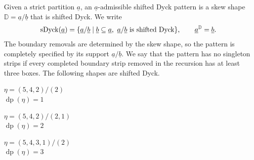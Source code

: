 \documentclass[12pt]{amsart}
\renewcommand{\a}{\underline{a}}
\renewcommand{\b}{\underline{b}}
\newcommand{\DD}{\mathbb{D}}
\newcommand{\defi}[1]{{\upshape\sffamily #1}}
\theoremstyle{definition}
\numberwithin{equation}{section}
\begin{document}
Given a strict partition $\a$, an \defi{$\a$-admissible shifted Dyck
pattern} is a skew shape $\DD=\a/\b$ that is shifted Dyck.
We write
\begin{equation}\label{eq:sh-patterns}
 \operatorname{sDyck}(\a)=
 \{\a/\b\mid\b\subseteq\a,\ \a/\b\textnormal{ is shifted Dyck}\},
 \qquad \a^{\DD}=\b.
\end{equation}
The boundary removals are determined by the skew shape,
so the pattern is completely specified by its support $\a/\b$.
We say that the pattern has \defi{no singleton strips} if every
completed boundary strip removed in the recursion has at least
three boxes. The following shapes are shifted Dyck. \\
\begingroup
\newcommand{\shExampleGrid}[1]{%
  \foreach \shrow/\shlen in {#1}{%
    \pgfmathtruncatemacro{\shlast}{\shrow+\shlen-1}%
    \foreach \shcol in {\shrow,...,\shlast}{%
      \draw[thick] ({2*(\shcol-1)},{-2*(\shrow-1)})
        rectangle ++(2,-2);
    }%
  }%
}
\begin{center}
\begin{minipage}[b]{.30\textwidth}
\centering
{}
\par\smallskip
$\eta=(5,4,2)/(2)$\\
$\operatorname{dp}(\eta)=1$
\end{minipage}
\hfill
\begin{minipage}[b]{.30\textwidth}
\centering
{}
\par\smallskip
$\eta=(5,4,2)/(2,1)$\\
$\operatorname{dp}(\eta)=2$
\end{minipage}
\hfill
\begin{minipage}[b]{.30\textwidth}
\centering
{}
\par\smallskip
$\eta=(5,4,3,1)/(2)$\\
$\operatorname{dp}(\eta)=3$
\end{minipage}
\end{center}
\end{document}
